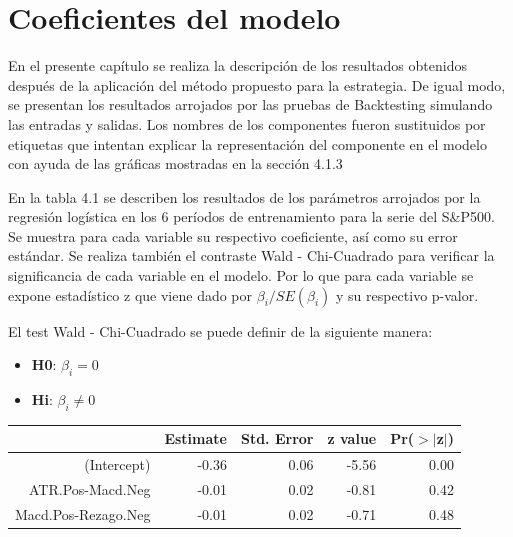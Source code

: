 \documentclass[a4paper,12pt]{Latex/Classes/PhDthesisPSnPDF}
\begin{document}


\newpage

\section{Coeficientes del modelo}

En el presente capítulo se realiza la descripción de los resultados obtenidos después de la aplicación del método propuesto para la estrategia. De igual modo, se presentan los resultados arrojados por las pruebas de Backtesting simulando las entradas y salidas. Los nombres de los componentes fueron sustituidos por etiquetas que intentan explicar la representación del componente en el modelo con ayuda de las gráficas mostradas en la sección 4.1.3


En la tabla 4.1 se describen los resultados de los parámetros arrojados por la regresión logística en los 6 períodos de entrenamiento para la serie del S\&P500. Se muestra para cada variable su respectivo coeficiente, así como su error estándar. Se realiza también el contraste Wald - Chi-Cuadrado para verificar la significancia de cada variable en el modelo. Por lo que para cada variable se expone estadístico z que viene dado por $\beta_{i}/SE(\beta_{i})$ y su respectivo p-valor.

El test Wald - Chi-Cuadrado se puede definir de la siguiente manera:

\begin{itemize}
\item \textbf{H0}: $\beta_{i} = 0$
\item \textbf{Hi}: $\beta_{i} \neq 0$
\end{itemize}

\begin{center}
\begin{table}[ht]
\centering
\begin{tabular}{rrrrr}
  \hline
 & Estimate & Std. Error & z value & Pr($>$$|$z$|$) \\ 
  \hline
(Intercept) & -0.36 & 0.06 & -5.56 & 0.00 \\ 
  ATR.Pos-Macd.Neg & -0.01 & 0.02 & -0.81 & 0.42 \\ 
  Macd.Pos-Rezago.Neg & -0.01 & 0.02 & -0.71 & 0.48 \\ 
   \hline
\end{tabular}
\end{table}\end{center}
\end{document}
